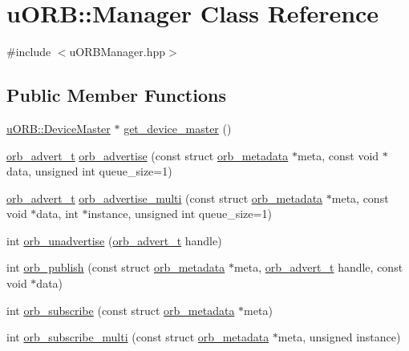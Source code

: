 \hypertarget{classuORB_1_1Manager}{}\section{u\+O\+RB\+:\+:Manager Class Reference}
\label{classuORB_1_1Manager}


{\ttfamily \#include $<$u\+O\+R\+B\+Manager.\+hpp$>$}

\subsection*{Public Member Functions}
\begin{DoxyCompactItemize}
\item 
\hyperlink{classuORB_1_1DeviceMaster}{u\+O\+R\+B\+::\+Device\+Master} $\ast$ \hyperlink{classuORB_1_1Manager_a083331e24ac4f99ac11a0aab1b1681b4}{get\+\_\+device\+\_\+master} ()
\item 
\hyperlink{uORB_8h_a8d0cfa5f9ea6427a37057d6cea6dd990}{orb\+\_\+advert\+\_\+t} \hyperlink{classuORB_1_1Manager_a42e075fba5970aa0730faab182e2083f}{orb\+\_\+advertise} (const struct \hyperlink{structorb__metadata}{orb\+\_\+metadata} $\ast$meta, const void $\ast$data, unsigned int queue\+\_\+size=1)
\item 
\hyperlink{uORB_8h_a8d0cfa5f9ea6427a37057d6cea6dd990}{orb\+\_\+advert\+\_\+t} \hyperlink{classuORB_1_1Manager_a808104f7ebeab8f0d548dd9127344b24}{orb\+\_\+advertise\+\_\+multi} (const struct \hyperlink{structorb__metadata}{orb\+\_\+metadata} $\ast$meta, const void $\ast$data, int $\ast$instance, unsigned int queue\+\_\+size=1)
\item 
int \hyperlink{classuORB_1_1Manager_a45601ddc722320b9cd660d9548263824}{orb\+\_\+unadvertise} (\hyperlink{uORB_8h_a8d0cfa5f9ea6427a37057d6cea6dd990}{orb\+\_\+advert\+\_\+t} handle)
\item 
int \hyperlink{classuORB_1_1Manager_abbe6966f841886ce3003ebc6d2198447}{orb\+\_\+publish} (const struct \hyperlink{structorb__metadata}{orb\+\_\+metadata} $\ast$meta, \hyperlink{uORB_8h_a8d0cfa5f9ea6427a37057d6cea6dd990}{orb\+\_\+advert\+\_\+t} handle, const void $\ast$data)
\item 
int \hyperlink{classuORB_1_1Manager_ae54072a80ad4de6d127e2dad8182b8fb}{orb\+\_\+subscribe} (const struct \hyperlink{structorb__metadata}{orb\+\_\+metadata} $\ast$meta)
\item 
int \hyperlink{classuORB_1_1Manager_a9a31fb71a0962db44450963559296cfe}{orb\+\_\+subscribe\+\_\+multi} (const struct \hyperlink{structorb__metadata}{orb\+\_\+metadata} $\ast$meta, unsigned instance)

\end{DoxyCompactItemize}
